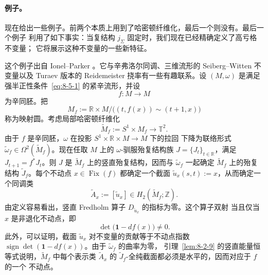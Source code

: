 \paragraph{例子。}
现在给出一些例子。前两个本质上用到了哈密顿纤维化，最后一个则没有。最后一个例子
利用了如下事实：当复结构 $j_\Sigma$ 固定时，我们现在已经精确定义了高亏格不变量；
它将展示这种不变量的一些新特征。

\begin{example}\label{ex:8-6-7}
这个例子出自 Ionel--Parker 。它与辛弗洛尔同调、三维流形的
Seiberg--Witten 不变量以及 Turaev 版本的 Reidemeister 挠率有一些有趣联系。设
$(M,\omega)$ 是满足强半正性条件~\eqref{eq:8-5-1} 的紧辛流形，并设
\[
  f:M\longrightarrow M
\]
为辛同胚。把
\[
  M_f:=\mathbb R\times M\big/\bigl((t,f(x))\sim(t+1,x)\bigr)
\]
称为映射圆。考虑局部哈密顿纤维化
\[
  \widetilde M_f:=S^1\times M_f\longrightarrow\mathbb T^2.
\]
由于 $f$ 是辛同胚，$\omega$ 在投影 $S^1\times\mathbb R\times M\to M$ 下的拉回
下降为联络形式 $\widetilde\omega_f\in\Omega^2(\widetilde M_f)$。现在任取
$M$ 上的 $\omega$-驯服殆复结构族
$J=\{J_t\}_{t\in\mathbb R}$，满足 $J_{t+1}=f^*J_t$。则 $J$ 是
$\widetilde M_f$ 上的竖直殆复结构，因而与 $\widetilde\omega_f$ 一起确定
$\widetilde M_f$ 上的殆复结构 $\widetilde J_f$。每个不动点
$x\in\operatorname{Fix}(f)$ 都确定一个截面
$\widetilde u_x(s,t):=x$，从而确定一个同调类
\[
  \widetilde A_x:=[\widetilde u_x]\in H_2(\widetilde M_f;\mathbb Z).
\]
由定义容易看出，竖直 Fredholm 算子 $D_{\widetilde u_x}$ 的指标为零。这个算子双射
当且仅当 $x$ 是非退化不动点，即
\[
  \det\bigl(\mathbf 1-df(x)\bigr)\ne0.
\]
此外，可以证明，截面 $\widetilde u_x$ 对不变量的贡献等于不动点指数
$\operatorname{sign}\det(\mathbf 1-df(x))$。由于 $\widetilde\omega_f$ 的曲率为零，
引理~\ref{lem:8-2-9} 的竖直能量恒等式说明，$\widetilde M_f$ 中每个表示类
$\widetilde A_x$ 的 $\widetilde J_f$-全纯截面都必须是水平的，因而对应于 $f$ 的一个
不动点。


\end{example}
